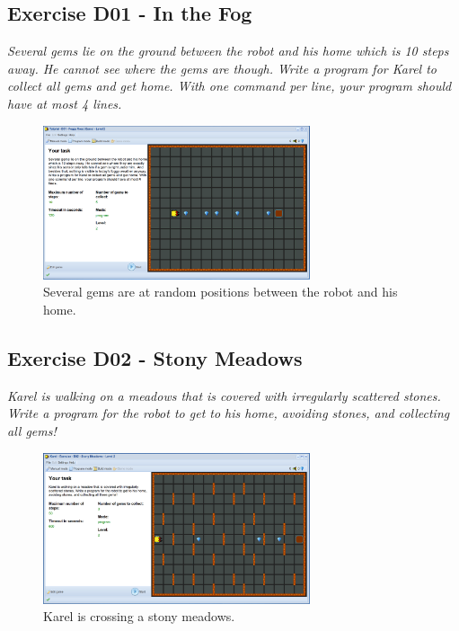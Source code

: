 \documentclass[article,A4,12pt]{llncs}
\begin{document}
{{{{\begin{enumerate}
\end{enumerate}

\subsection{Exercise D01 - In the Fog}

{\em Several gems lie on the ground between the robot and his home which is 10 steps away. 
He cannot see where the gems are though. 
Write a program for Karel to collect all gems and get home. With one command per 
line, your program should have at most 4 lines.}


\begin{figure}[!ht]
\begin{center}
\includegraphics[width=0.7\textwidth]{img/d01.png}
\end{center}
\vspace{-4mm}
\caption{Several gems are at random positions between the robot and his home.}
\label{fig:d01}
\vspace{-4mm}
\end{figure}
\noindent

\subsection{Exercise D02 - Stony Meadows}

{\em Karel is walking on a meadows that is covered with irregularly 
scattered stones. Write a program for the robot to get to his home, 
avoiding stones, and collecting all gems!  }


\begin{figure}[!ht]
\begin{center}
\includegraphics[width=0.7\textwidth]{img/d02.png}
\end{center}
\vspace{-4mm}
\caption{Karel is crossing a stony meadows.}
\label{fig:d02}
\vspace{-10mm}
\end{figure}
\noindent

}}}}
\end{document}
